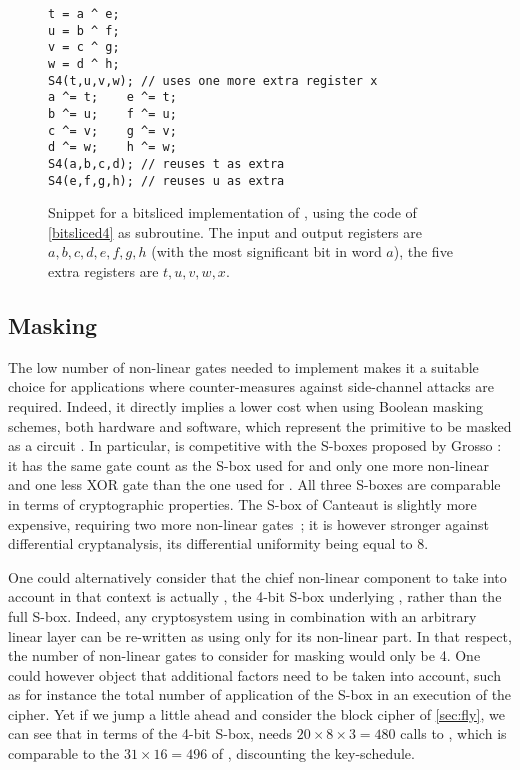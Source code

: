 \begin{figure}[ht]
\begin{verbatim}
t = a ^ e;
u = b ^ f;
v = c ^ g;
w = d ^ h;
S4(t,u,v,w); // uses one more extra register x
a ^= t;    e ^= t;
b ^= u;    f ^= u;
c ^= v;    g ^= v;
d ^= w;    h ^= w;
S4(a,b,c,d); // reuses t as extra
S4(e,f,g,h); // reuses u as extra
\end{verbatim}
\caption[Snippet for a bitsliced \C implementation of \littlunOne.]{Snippet for a bitsliced \C implementation of \littlunOne, using the code of \autoref{bitsliced4} as subroutine\label{bitsliced8}. The input and output registers
are $a,b,c,d,e,f,g,h$ (with the most significant bit in word $a$), the five extra registers are $t,u,v,w,x$.}
\end{figure}


\subsection{Masking}
The low number of non-linear gates needed to implement \littlunOne makes it a suitable choice for applications where counter-measures against side-channel attacks are required.
Indeed, it directly implies a lower cost when using Boolean masking schemes, both hardware and software, which represent the primitive to be masked as a circuit \cite{isw,DBLP:conf/fse/CarletGPQR12}.
In particular, \littlunOne is competitive with the S-boxes proposed by Grosso \etal \cite{lsdesigns}: it has the same gate count as the S-box used for \robin and only
one more non-linear and one less XOR gate than the one used for \fantomas. All three S-boxes are comparable in terms of cryptographic properties.
The S-box of Canteaut \etal is slightly more expensive, requiring two more non-linear gates~\cite{sac15}; it is however stronger against differential cryptanalysis,
its differential uniformity being equal to 8.

One could alternatively consider that the chief non-linear component to take into account in that context is actually \littlunS, the 4-bit S-box underlying \littlunOne, rather than the full S-box.
Indeed, any cryptosystem using \littlunOne in combination with an arbitrary linear layer
can be re-written as using only \littlunS for its non-linear part. In that respect, the number of non-linear gates to consider for masking would only be 4. One could however
object that
additional factors need to be taken into account, such as for instance the total number of application of the S-box in an execution of the cipher. Yet if we jump a little ahead and
consider the block cipher \fly of \autoref{sec:fly}, we can see that in terms of the 4-bit S-box, \fly needs $20\times8\times3 = 480$ calls to \littlunS, which is
comparable to the $31\times16 = 496$ of \present, discounting the key-schedule.

